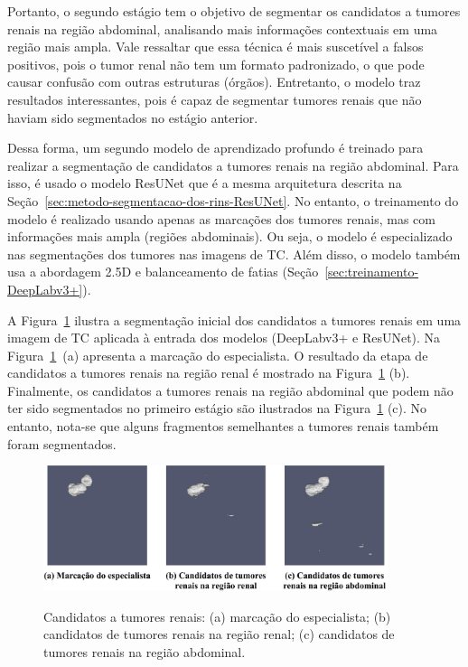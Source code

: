 Portanto, o segundo estágio tem o objetivo de segmentar os candidatos a tumores renais na região abdominal, analisando mais informações contextuais em uma região mais ampla. Vale ressaltar que essa técnica é mais suscetível a falsos positivos, pois o tumor renal não tem um formato padronizado, o que pode causar confusão com outras estruturas (órgãos). Entretanto, o modelo traz resultados interessantes, pois é capaz de segmentar tumores renais que não haviam sido segmentados no estágio anterior.

Dessa forma, um segundo modelo de aprendizado profundo é treinado para realizar a segmentação de candidatos a tumores renais na região abdominal. Para isso, é usado o modelo ResUNet que é a mesma arquitetura descrita na Seção~\ref{sec:metodo-segmentacao-dos-rins-ResUNet}. No entanto, o treinamento do modelo é realizado usando apenas as marcações dos tumores renais, mas com informações mais ampla (regiões abdominais). Ou seja, o modelo é especializado nas segmentações dos tumores nas imagens de TC. Além disso, o modelo também usa a abordagem 2.5D e balanceamento de fatias (Seção~\ref{sec:treinamento-DeepLabv3+}). 

A Figura~\ref{fig:candidatos-de-tumores-renais} ilustra a segmentação inicial dos candidatos a tumores renais em uma imagem de TC aplicada à entrada dos modelos (DeepLabv3+ e ResUNet). Na Figura~\ref{fig:candidatos-de-tumores-renais}~(a) apresenta a marcação do especialista. O resultado da etapa de candidatos a tumores renais na região renal é mostrado na Figura~\ref{fig:candidatos-de-tumores-renais} (b). Finalmente, os candidatos a tumores renais na região abdominal que podem não ter sido segmentados no primeiro estágio são ilustrados na Figura~\ref{fig:candidatos-de-tumores-renais} (c). No entanto, nota-se que alguns fragmentos semelhantes a tumores renais também foram segmentados.

\begin{figure}[!ht]
    \centering
    \caption{Candidatos a tumores renais: (a) marcação do especialista; (b) candidatos de tumores renais na região renal; (c) candidatos de tumores renais na região abdominal.}
    \includegraphics[width=0.9\textwidth]{figuras/candidatos-de-tumores-renais.pdf}
    \label{fig:candidatos-de-tumores-renais}
\end{figure}


